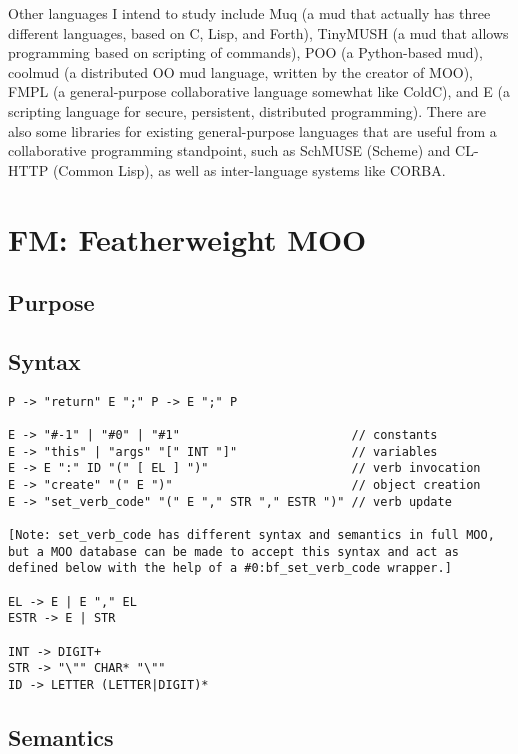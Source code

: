 \documentclass{article}
\begin{document}
Other languages I intend to study include Muq\cite{Muq} (a mud that
actually has three different languages, based on C, Lisp, and Forth),
TinyMUSH\cite{MUSH} (a mud that allows programming based on scripting
of commands), POO\cite{POO} (a Python-based mud),
coolmud\cite{coolmud} (a distributed OO mud language, written by the
creator of MOO), FMPL\cite{FMPL} (a general-purpose collaborative
language somewhat like ColdC), and E\cite{E} (a scripting language for
secure, persistent, distributed programming).  There are also some
libraries for existing general-purpose languages that are useful from
a collaborative programming standpoint, such as SchMUSE\cite{SchMUSE}
(Scheme) and CL-HTTP\cite{CL-HTTP} (Common Lisp), as well as
inter-language systems like CORBA\cite{CORBA}.

\appendix
\section{FM: Featherweight MOO}
\label{FM}

\subsection{Purpose}

\subsection{Syntax}

\begin{verbatim}
P -> "return" E ";" P -> E ";" P

E -> "#-1" | "#0" | "#1"                        // constants
E -> "this" | "args" "[" INT "]"                // variables
E -> E ":" ID "(" [ EL ] ")"                    // verb invocation
E -> "create" "(" E ")"                         // object creation
E -> "set_verb_code" "(" E "," STR "," ESTR ")" // verb update

[Note: set_verb_code has different syntax and semantics in full MOO,
but a MOO database can be made to accept this syntax and act as
defined below with the help of a #0:bf_set_verb_code wrapper.]

EL -> E | E "," EL
ESTR -> E | STR

INT -> DIGIT+
STR -> "\"" CHAR* "\""
ID -> LETTER (LETTER|DIGIT)*
\end{verbatim}

\subsection{Semantics}
\end{document}
